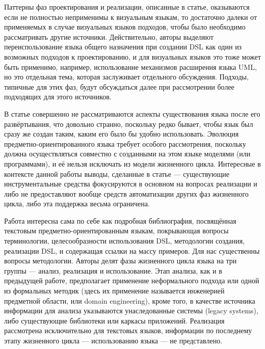 Паттерны фаз проектирования и реализации, описанные в статье, оказываются если не полностью 
неприменимы к визуальным языкам, то достаточно далеки от применяемых в случае визуальных 
языков подходов, чтобы было необходимо рассматривать другие источники. Действительно, 
авторы выделяют переиспользование языка общего назначения при создании DSL как один 
из возможных подходов к проектированию, и для визуальных языков это тоже может быть 
применимо, например, использование механизмов расширения языка UML, но это отдельная 
тема, которая заслуживает отдельного обсуждения. Подходы, типичные для этих фаз, будут 
обсуждаться далее при рассмотрении более подходящих для этого источников.

В статье совершенно не рассматриваются аспекты существования языка после его развёртывания, 
что довольно странно, поскольку редко бывает, чтобы язык был сразу же создан таким, 
каким его было бы удобно использовать. Эволюция предметно-ориентированного языка требует 
особого рассмотрения, поскольку должна осуществляться совместно с созданными на этом языке 
моделями (или программами), и её нельзя исключать из модели жизненного цикла. Интересные 
в контексте данной работы выводы, сделанные в статье –-- существующие инструментальные средства 
фокусируются в основном на вопросах реализации и либо не предоставляют вообще средств 
автоматизации других фаз жизненного цикла, либо эта поддержка весьма ограничена. 

Работа \cite{van2000domain} интересна сама по себе как подробная библиография, посвящённая 
текстовым предметно-ориентированным языкам, покрывающая вопросы терминологии, целесообразности 
использования DSL, методологии создания, реализации DSL, и содержащая ссылки на массу 
примеров. Для нас существенны вопросы методологии. Авторы делят фазы жизненного цикла языка 
на три группы --- анализ, реализация и использование. Этап анализа, как и в предыдущей работе, 
предполагает применение неформального подхода или одной из формальных методик (здесь их 
применение называется инженерией предметной области, или domain engineering), кроме 
того, в качестве источника информации для анализа указываются унаследованные системы 
(legacy systems), либо существующие библиотеки или каркасы приложений. Реализация 
рассмотрена исключительно для текстовых языков, информации по последнему этапу жизненного 
цикла --- использованию языка --- не представлено.

